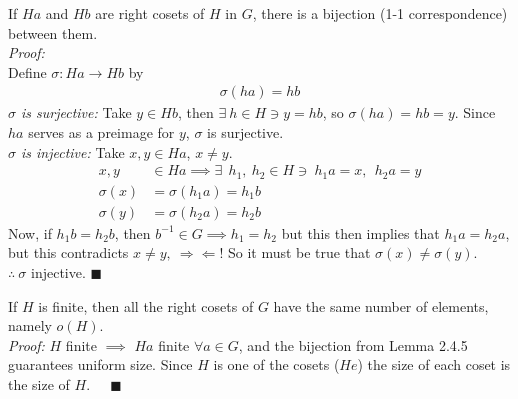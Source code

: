 \begin{lemma}
If $Ha$ and $Hb$ are right cosets of $H$ in $G$, there is a bijection (1-1 correspondence) between them.\\
\textit{Proof:}\\
Define $\sigma: Ha\rightarrow Hb$ by
\begin{align}
    \sigma(ha)=hb \nonumber
\end{align}
\textit{$\sigma$ is surjective:} Take $y\in Hb$, then $\exists \ h\in H\ni y=hb$, so $\sigma(ha)=hb=y$. Since $ha$ serves as a preimage for $y$, $\sigma$ is surjective.\\
\textit{$\sigma$ is injective:} Take $x,y \in Ha $, $x\neq y$.
\begin{align}
    x,y &\in Ha \implies \exists \ \ h_1,\ h_2\in H\ni \ h_1a=x, \ \ h_2a=y \nonumber \\
    \sigma(x)&=\sigma(h_1 a)=h_1 b \nonumber \\
    \sigma(y)&=\sigma(h_2 a)=h_2 b \nonumber
\end{align}
Now, if $h_1b=h_2b$, then $b^{-1}\in G \implies h_1=h_2$ but this then implies that $h_1a=h_2a$, but this contradicts $x\neq y, \ \Rightarrow \Leftarrow$! So it must be true that $\sigma(x)\neq \sigma(y)$.\\
$\therefore \ \sigma$ injective. $\blacksquare$ 
\end{lemma}
\setcounter{dummy_lemma}{4}
\begin{corollary}
If $H$ is finite, then all the right cosets of $G$ have the same number of elements, namely $o(H)$.\\
\textit{Proof:} $H$ finite $\implies$ $Ha$ finite $\forall a \in G$, and the bijection from Lemma 2.4.5 guarantees uniform size. Since $H$ is one of the cosets ($He$) the size of each coset is the size of $H$. $\ \ \ \ \ \blacksquare$
\end{corollary} 

